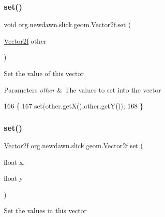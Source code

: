 \subsubsection{\texorpdfstring{set()}{set()}\hspace{0.1cm}{\footnotesize\ttfamily [1/3]}}
{\footnotesize\ttfamily void org.\+newdawn.\+slick.\+geom.\+Vector2f.\+set (\begin{DoxyParamCaption}\item[{\mbox{\hyperlink{classorg_1_1newdawn_1_1slick_1_1geom_1_1_vector2f}{Vector2f}}}]{other }\end{DoxyParamCaption})\hspace{0.3cm}{\ttfamily [inline]}}

Set the value of this vector


\begin{DoxyParams}{Parameters}
{\em other} & The values to set into the vector \\
\hline
\end{DoxyParams}

\begin{DoxyCode}
166                                     \{
167         \textcolor{keyword}{set}(other.getX(),other.getY());
168     \}
\end{DoxyCode}
\mbox{\label{classorg_1_1newdawn_1_1slick_1_1geom_1_1_vector2f_a0302301f39873b5c4f1eb57b22a918e7}} 
\subsubsection{\texorpdfstring{set()}{set()}\hspace{0.1cm}{\footnotesize\ttfamily [2/3]}}
{\footnotesize\ttfamily \mbox{\hyperlink{classorg_1_1newdawn_1_1slick_1_1geom_1_1_vector2f}{Vector2f}} org.\+newdawn.\+slick.\+geom.\+Vector2f.\+set (\begin{DoxyParamCaption}\item[{float}]{x,  }\item[{float}]{y }\end{DoxyParamCaption})\hspace{0.3cm}{\ttfamily [inline]}}

Set the values in this vector


